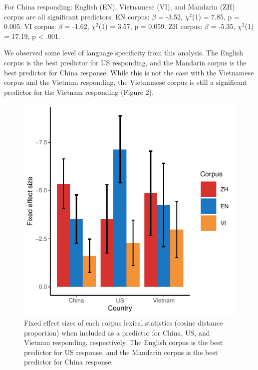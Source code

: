 \documentclass[10pt, letterpaper]{article}
\newenvironment{CodeChunk}{}{}
\begin{document}
For China responding: English (EN), Vietnamese (VI), and Mandarin (ZH)
corpus are all significant predictors. EN corpus: \(\beta\) = -3.52,
\(\chi^2\)(1) = 7.85, p = 0.005. VI corpus: \(\beta\) = -1.62,
\(\chi^2\)(1) = 3.57, p = 0.059. ZH corpus: \(\beta\) = -5.35,
\(\chi^2\)(1) = 17.19, p \textless{} .001.

We observed some level of language specificity from this analysis. The
English corpus is the best predictor for US responding, and the Mandarin
corpus is the best predictor for China response. While this is not the
case with the Vietnamese corpus and the Vietnam responding, the
Vietnamese corpus is still a significant predictor for the Vietnam
responding (Figure 2).

\begin{CodeChunk}
\begin{figure}[tb]

{\centering \includegraphics{figs/unnamed-chunk-3-1} 

}

\caption[Fixed effect sizes of each corpus lexical statistics (cosine distance proportion) when included as a predictor for China, US, and Vietnam responding, respectively]{Fixed effect sizes of each corpus lexical statistics (cosine distance proportion) when included as a predictor for China, US, and Vietnam responding, respectively. The English corpus is the best predictor for US response, and the Mandarin corpus is the best predictor for China response.}\label{fig:unnamed-chunk-3}
\end{figure}
\end{CodeChunk}
\end{document}
